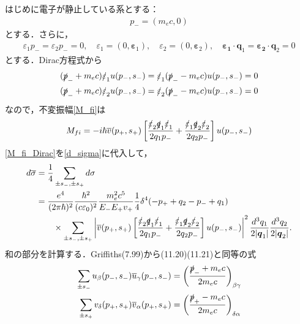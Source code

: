 はじめに電子が静止している系とする：
\begin{align}
  p_- = (m_ec,0)
\end{align}
とする．さらに，
\begin{align}
  \varepsilon_1p_- = \varepsilon_2p_- = 0,\quad \varepsilon_1 = (0,\boldsymbol{\varepsilon}_1),\quad \varepsilon_2 = (0,\boldsymbol{\varepsilon}_2),\quad \boldsymbol{\varepsilon_1}\cdot\boldsymbol{q}_1 = \boldsymbol{\varepsilon_2}\cdot\boldsymbol{q}_2 = 0
\end{align}
とする．Dirac方程式から
\begin{align}
  (\slashed{p}_- + m_ec)\slashed{\varepsilon}_1 u(p_-,s_-) &= \slashed{\varepsilon}_1 (\slashed{p}_- - m_ec) u(p_-,s_-) = 0 \\
  (\slashed{p}_- + m_ec)\slashed{\varepsilon}_2 u(p_-,s_-) &= \slashed{\varepsilon}_2 (\slashed{p}_- - m_ec) u(p_-,s_-) = 0
\end{align}
なので，不変振幅\eqref{M_fi}は
\begin{align}
  M_{fi} = -i\hbar \overline{v}(p_+,s_+)\left[\frac{\slashed{\varepsilon}_2\slashed{q}_1\slashed{\varepsilon}_1}{2q_1p_-} + \frac{\slashed{\varepsilon}_1\slashed{q}_2\slashed{\varepsilon}_2}{2q_2p_-}\right] u(p_-,s_-)\label{M_fi_Dirac}
\end{align}
\eqref{M_fi_Dirac}を\eqref{d_sigma}に代入して，
\begin{align}
  \begin{split}
    d\overline{\sigma} &= \frac{1}{4}\sum_{\pm s_-,\pm s_+}d\sigma \\
    &= \frac{e^4}{(2\pi\hbar)^2} \frac{\hbar^2}{(c\varepsilon_0)^2} \frac{m_e^2c^5}{E_-E_+v_+} \frac{1}{4} \delta^4(-p_+ + q_2 - p_- + q_1)\\
    &\qquad\times \sum_{\pm s_-,\pm s_+}\left\lvert \overline{v}(p_+,s_+)\left[\frac{\slashed{\varepsilon}_2\slashed{q}_1\slashed{\varepsilon}_1}{2q_1p_-} + \frac{\slashed{\varepsilon}_1\slashed{q}_2\slashed{\varepsilon}_2}{2q_2p_-}\right] u(p_-,s_-) \right\rvert^2 \frac{d^3q_1}{2\lvert\boldsymbol{q}_1\rvert} \frac{d^3q_2}{2\lvert\boldsymbol{q}_2\rvert}.
  \end{split}\label{d_sigma_spin_ave}
\end{align}
和の部分を計算する．Griffiths(7.99)から(11.20)(11.21)と同等の式
\begin{align}
  \sum_{\pm s_-} u_\beta(p_-, s_-) \overline{u}_\gamma(p_-,s_-) &= \left( \frac{\slashed{p}_- + m_ec}{2m_ec} \right)_{\beta\gamma} \\
  \sum_{\pm s_+} v_\delta(p_+, s_+) \overline{v}_\alpha(p_+,s_+) &= \left( \frac{\slashed{p}_+ - m_ec}{2m_ec} \right)_{\delta\alpha}
\end{align}
